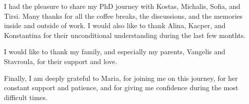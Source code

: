 
I had the pleasure to share my PhD journey with Kostas, Michalis, Sofia, and Tirsi. Many thanks for all the coffee breaks, the discussions, and the memories inside and outside of work. I would also like to thank Alina, Kacper, and Konstantina for their unconditional understanding during the last few monthts. 

I would like to thank my family, and especially my parents, Vangelis and Stavroula, for their support and love.

Finally, I am deeply grateful to Maria, for joining me on this journey, for her constant support and patience, and for giving me confidence during the most difficult times. 